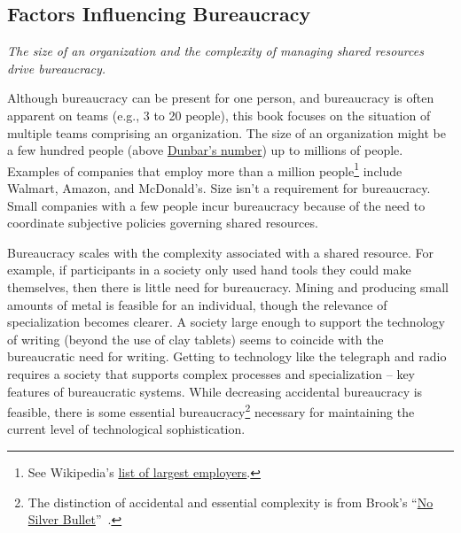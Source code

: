 \subsection*{Factors Influencing Bureaucracy}

\textit{The size of an organization and the complexity of managing shared resources drive bureaucracy.}

Although bureaucracy can be present for one person, and bureaucracy is often apparent on teams (e.g., 3 to 20 people), this book focuses on the situation of multiple teams comprising an organization. The size of an organization might be a few hundred people (above \href{https://en.wikipedia.org/wiki/Dunbar\%27s_number}{Dunbar's number})\iftoggle{WPinmargin}{\marginpar{$>$Wikipedia: Dunbar's number}}{}
 up to millions of people. 
Examples of companies that employ more than a million people\footnote{See Wikipedia's \href{https://en.wikipedia.org/wiki/List_of_largest_employers}{list of largest employers}.
} include Walmart, Amazon, and McDonald's. Size isn't a requirement for bureaucracy. Small companies with a few people incur bureaucracy because of the need to coordinate subjective policies governing shared resources. 


Bureaucracy scales with the complexity associated with a shared resource. For example, if participants in a society only used hand tools they could make themselves, then there is little need for bureaucracy. Mining and producing small amounts of metal is feasible for an individual, though the relevance of specialization becomes clearer. A society large enough to support the technology of writing (beyond the use of clay tablets) seems to coincide with the bureaucratic need for writing. Getting to technology like the telegraph and radio requires a society that supports complex processes and specialization -- key features of bureaucratic systems. While decreasing accidental bureaucracy is feasible, there is some essential bureaucracy\footnote{The distinction of accidental and essential complexity is from Brook's 
``\href{https://en.wikipedia.org/wiki/No_Silver_Bullet\%23Summary}{No Silver Bullet}''~\cite{1986_brooks}.
}
necessary for maintaining the current level of technological sophistication. 

